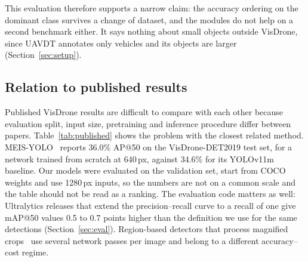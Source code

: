\documentclass[preprint,12pt]{elsarticle}
\begin{document}
This evaluation therefore supports a narrow claim: the accuracy ordering on the
dominant class survives a change of dataset, and the modules do not help on a second
benchmark either. It says nothing about small objects outside VisDrone, since UAVDT
annotates only vehicles and its objects are larger (Section~\ref{sec:setup}).

\begin{table}[t]
\centering
\caption{Zero-shot AP@50 on UAVDT at 1280\,px (seed 0), with the number of
ground-truth boxes in brackets. No model was trained on UAVDT. The mean weights the
three classes equally, so the rare classes dominate it.}
\label{tab:uavdt}
\small
{}
\end{table}

\subsection{Relation to published results}
\label{sec:res-published}

Published VisDrone results are difficult to compare with each other because
evaluation split, input size, pretraining and inference procedure differ between
papers. Table~\ref{tab:published} shows the problem with the closest related
method. MEIS-YOLO~\cite{meis-yolo} reports 36.0\% AP@50 on the VisDrone-DET2019
test set, for a network trained from scratch at 640\,px, against 34.6\% for its
YOLOv11m baseline. Our models were evaluated on the validation set, start from
COCO weights and use 1280\,px inputs, so the numbers are not on a common scale and
the table should not be read as a ranking. The evaluation code matters as well:
Ultralytics releases that extend the precision--recall curve to a recall of one
give mAP@50 values 0.5 to 0.7 points higher than the definition we use for the
same detections (Section~\ref{sec:eval}). Region-based detectors that process
magnified crops~\cite{clusdet,li2020dmnet,huang2022ufpmp} use several network
passes per image and belong to a different accuracy--cost regime.
\end{document}
